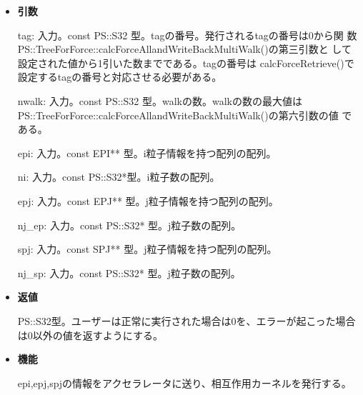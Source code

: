 \begin{itemize}

\item {\bf 引数}


  tag: 入力。const PS::S32 型。tagの番号。発行されるtagの番号は0から関
  数PS::TreeForForce::calcForceAllandWriteBackMultiWalk()の第三引数と
  して設定された値から1引いた数までである。tagの番号は
  calcForceRetrieve()で設定するtagの番号と対応させる必要がある。

  nwalk: 入力。const PS::S32 型。walkの数。walkの数の最大値は
  PS::TreeForForce::calcForceAllandWriteBackMultiWalk()の第六引数の値
  である。

  epi: 入力。const EPI** 型。i粒子情報を持つ配列の配列。

  ni: 入力。const PS::S32*型。i粒子数の配列。

  epj: 入力。const EPJ** 型。j粒子情報を持つ配列の配列。
  
  nj\_ep: 入力。const PS::S32* 型。j粒子数の配列。

  spj: 入力。const SPJ** 型。j粒子情報を持つ配列の配列。
  
  nj\_sp: 入力。const PS::S32* 型。j粒子数の配列。

\item {\bf 返値}

  PS::S32型。ユーザーは正常に実行された場合は0を、エラーが起こった場合
  は0以外の値を返すようにする。
  
\item {\bf 機能}

epi,epj,spjの情報をアクセラレータに送り、相互作用カーネルを発行する。
  
\end{itemize}

